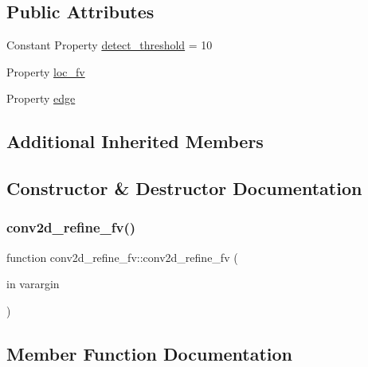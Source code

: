 \subsection*{Public Attributes}
\begin{DoxyCompactItemize}
\item 
Constant Property \hyperlink{classconv2d__refine__fv_a82dabe5ec683bb9fe0c0a8ecf62a29f8}{detect\+\_\+threshold} = 10
\item 
Property \hyperlink{classconv2d__refine__fv_aa9c4693b06c9d163795ee7ce22ee87b9}{loc\+\_\+fv}
\item 
Property \hyperlink{classconv2d__refine__fv_a4a636a19651dbaae917c8207eb700ccf}{edge}
\end{DoxyCompactItemize}
\subsection*{Additional Inherited Members}


\subsection{Constructor \& Destructor Documentation}
\mbox{\label{classconv2d__refine__fv_aacfa0b69ddd6af6a37159f70bc805a7d}} 
\subsubsection{\texorpdfstring{conv2d\+\_\+refine\+\_\+fv()}{conv2d\_refine\_fv()}}
{\footnotesize\ttfamily function conv2d\+\_\+refine\+\_\+fv\+::conv2d\+\_\+refine\+\_\+fv (\begin{DoxyParamCaption}\item[{in}]{varargin }\end{DoxyParamCaption})}



\subsection{Member Function Documentation}
\mbox{\label{classconv2d__refine__fv_a1845bdc57723cafc813dc16bb0583f00}} 
